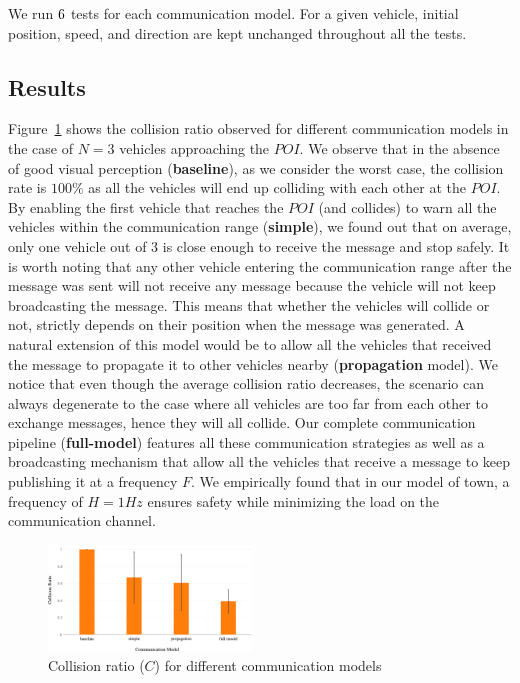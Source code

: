We run $\num_test_per_scenario$ tests for each communication model. For a given vehicle, initial position, 
speed, and direction are kept unchanged throughout all the tests.

\subsection{Results}

Figure~\ref{fig:collision_ratio} shows the collision ratio observed for different communication models in the
case of $N=3$ vehicles approaching the $POI$. We observe that in the absence of good visual perception
(\textbf{baseline}), as we consider the worst case, the collision rate is $100\%$ as all the vehicles will end up 
colliding with each other at the $POI$. By enabling the first vehicle that reaches the $POI$ (and collides) to
warn all the vehicles within the communication range (\textbf{simple}), we found out that on 
average, only one vehicle out of $3$ is close enough to receive the message and stop safely. It is worth noting
that any other vehicle entering the communication range after the message was sent will not receive any message
because the vehicle will not keep broadcasting the message. This means that whether the vehicles will collide or 
not, strictly depends on their position when the message was generated. A natural extension of this model
would be to allow all the vehicles that received the message to propagate it to other vehicles nearby 
(\textbf{propagation} model). We notice that even though the average collision ratio decreases,
the scenario can always degenerate to the case where all vehicles are too far from each other to exchange 
messages, hence they will all collide. 
Our complete communication pipeline (\textbf{full-model}) features all these communication strategies as well
as a broadcasting mechanism that allow all the vehicles that receive a message to keep publishing it at a frequency 
$F$. We empirically found that in our model of town, a frequency of $H=1Hz$ ensures safety while minimizing 
the load on the communication channel.

\begin{figure}[t]
    \centering
    \includegraphics[width=0.48\textwidth, height=0.24\textwidth]{figures/collision_ratio.pdf}
    \caption{Collision ratio ($C$) for different communication models \label{fig:collision_ratio}}
\end{figure}

